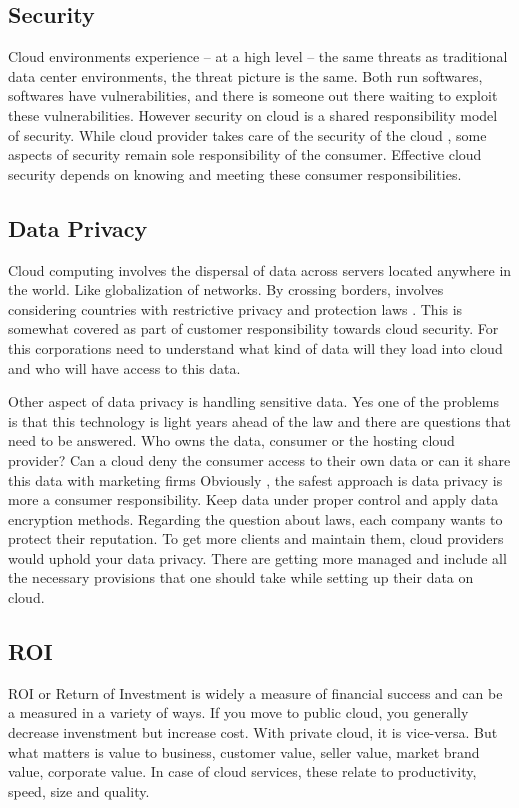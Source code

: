 \subsection{Security}
Cloud environments experience – at a high level – the same threats as traditional data center environments, the threat picture is the same. Both run softwares, softwares have vulnerabilities, and there is someone out there waiting to exploit these vulnerabilities. However security on cloud is a shared responsibility model of security. While cloud provider takes care of the security of the cloud , some aspects of security remain sole responsibility of the consumer. Effective cloud security depends on knowing and meeting these consumer responsibilities. 

\subsection{Data Privacy} 
Cloud computing involves the dispersal of data across servers located anywhere in the world. Like globalization of networks. By crossing borders, involves considering countries with restrictive privacy and protection laws . This is somewhat covered as part of customer responsibility towards cloud security. For this corporations need to understand what kind of data will they load into cloud and who will have access to this data. \cite{DataPrivacy}

Other aspect of data privacy is handling sensitive data. Yes one of the problems is that this technology is light years ahead of the law and there are questions that need to be answered. Who owns the data, consumer or the hosting cloud provider? Can a cloud deny the consumer access to their own data or can it share this data with marketing firms  Obviously , the safest approach is data privacy is more a consumer responsibility. Keep data under proper control and apply data encryption methods. Regarding the question about laws, each company wants to protect their reputation. To get more clients and maintain them, cloud providers would uphold your data privacy. There are getting more managed and include all the necessary provisions that one should take while setting up their data on cloud. \cite{DataPrivacy2}

\subsection{ROI}
ROI or Return of Investment is widely a measure of financial success and can be a measured in a variety of ways. If you move to public cloud, you generally decrease invenstment but increase cost. With private cloud, it is vice-versa. But what matters is value to business, customer value, seller value, market brand value, corporate value. In case of cloud services, these relate to productivity, speed, size and quality. \cite{ROI}

